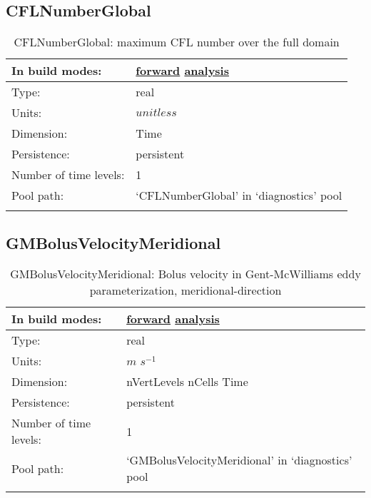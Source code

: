 \subsection[CFLNumberGlobal]{CFLNumberGlobal}
\label{subsec:var_sec_diagnostics_CFLNumberGlobal}
\begin{center}
\begin{longtable}{| p{2.0in} | p{4.0in} |}
        \hline 
        In build modes: & \hyperref[subsec:forward_var_tab_diagnostics]{forward} \hyperref[subsec:analysis_var_tab_diagnostics]{analysis} \\
        \hline 
        Type: & real \\
        \hline 
        Units: & $unitless$ \\
        \hline 
        Dimension: & Time \\
        \hline 
        Persistence: & persistent \\
        \hline 
        Number of time levels: & 1 \\
        \hline 
            Pool path: & `CFLNumberGlobal' in `diagnostics' pool \\
		 \hline 
    \caption{CFLNumberGlobal: maximum CFL number over the full domain}
\end{longtable}
\end{center}
\subsection[GMBolusVelocityMeridional]{GMBolusVelocityMeridional}
\label{subsec:var_sec_diagnostics_GMBolusVelocityMeridional}
\begin{center}
\begin{longtable}{| p{2.0in} | p{4.0in} |}
        \hline 
        In build modes: & \hyperref[subsec:forward_var_tab_diagnostics]{forward} \hyperref[subsec:analysis_var_tab_diagnostics]{analysis} \\
        \hline 
        Type: & real \\
        \hline 
        Units: & $m$ $s^{-1}$ \\
        \hline 
        Dimension: & nVertLevels nCells Time \\
        \hline 
        Persistence: & persistent \\
        \hline 
        Number of time levels: & 1 \\
        \hline 
            Pool path: & `GMBolusVelocityMeridional' in `diagnostics' pool \\
		 \hline 
    \caption{GMBolusVelocityMeridional: Bolus velocity in Gent-McWilliams eddy parameterization, meridional-direction}
\end{longtable}
\end{center}
